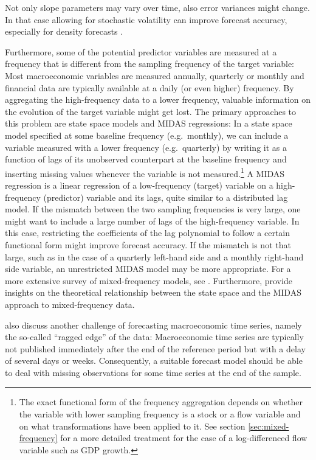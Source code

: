 Not only slope parameters may vary over time, also error variances might change. In that case allowing for stochastic volatility can improve forecast accuracy, especially for density forecasts \citep{Clark2011}.

Furthermore, some of the potential predictor variables are measured at a frequency that is different from the sampling frequency of the target variable: Most macroeconomic variables are measured annually, quarterly or monthly and financial data are typically available at a daily (or even higher) frequency. By aggregating the high-frequency data to a lower frequency, valuable information on the evolution of the target variable might get lost. The primary approaches to this problem are state space models and MIDAS regressions: In a state space model specified at some baseline frequency (e.g.~monthly), we can include a variable measured with a lower frequency (e.g.~quarterly) by writing it as a function of lags of its unobserved counterpart at the baseline frequency and inserting missing values whenever the variable is not measured.\footnote{
	The exact functional form of the frequency aggregation depends on whether the variable with lower sampling frequency is a stock or a flow variable and on what transformations have been applied to it. See section \ref{sec:mixed-frequency} for a more detailed treatment for the case of a log-differenced flow variable such as GDP growth.
} A MIDAS regression is a linear regression of a low-frequency (target) variable on a high-frequency (predictor) variable and its lags, quite similar to a distributed lag model. If the mismatch between the two sampling frequencies is very large, one might want to include a large number of lags of the high-frequency variable. In this case, restricting the coefficients of the lag polynomial to follow a certain functional form might improve forecast accuracy. If the mismatch is not that large, such as in the case of a quarterly left-hand side and a monthly right-hand side variable, an unrestricted MIDAS model may be more appropriate. For a more extensive survey of mixed-frequency models, see \citet{ForoniMarcellino2013}. Furthermore, \citet{BaiEtal2013} provide insights on the theoretical relationship between the state space and the MIDAS approach to mixed-frequency data.
	
\citeauthor{ForoniMarcellino2013} also discuss another challenge of forecasting macroeconomic time series, namely the so-called ``ragged edge'' of the data: Macroeconomic time series are typically not published immediately after the end of the reference period but with a delay of several days or weeks. Consequently, a suitable forecast model should be able to deal with missing observations for some time series at the end of the sample.

